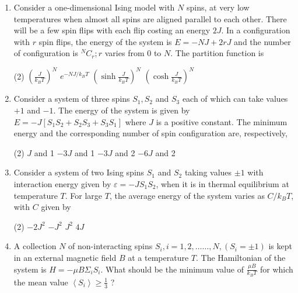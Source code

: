 \begin{enumerate}
\begin{tasks}
		\task[\textbf{b.}]oscillates during evolution to equilibrium
		\task[\textbf{c.}]is a maximum at equilibrium
		\task[\textbf{d.}]is a minimum at equilibrium 
	\end{tasks}
\item 	Consider a one-dimensional Ising model with $N$ spins, at very low temperatures when almost all spins are aligned parallel to each other. There will be a few spin flips with each flip costing an energy $2 J$. In a configuration with $r$ spin flips, the energy of the system is $E=-N J+2 r J$ and the number of configuration is ${ }^{N} C_{r} ; r$ varies from 0 to $N$. The partition function is
{	}
	 \begin{tasks}(2)
		\task[\textbf{a.}] $\left(\frac{J}{k_{B} T}\right)^{N}$
		\task[\textbf{b.}]$e^{-N J / k_{B} T}$
		\task[\textbf{c.}] $\left(\sinh \frac{J}{k_{B} T}\right)^{N}$
		\task[\textbf{d.}] $\left(\cosh \frac{J}{k_{B} T}\right)^{N}$
	\end{tasks}
	\item Consider a system of three spins $S_{1}, S_{2}$ and $S_{3}$ each of which can take values $+1$ and $-1$. The energy of the system is given by $E=-J\left[S_{1} S_{2}+S_{2} S_{3}+S_{3} S_{1}\right]$ where $J$ is a positive constant. The minimum energy and the corresponding number of spin configuration are, respectively,
	{	}
	 \begin{tasks}(2)
		\task[\textbf{a.}]$J$ and 1
		\task[\textbf{b.}]$-3 J$ and 1
		\task[\textbf{c.}]$-3 J$ and 2
		\task[\textbf{d.}]  $-6 J$ and 2
	\end{tasks}
\item 	Consider a system of two Ising spins $S_{1}$ and $S_{2}$ taking values $\pm 1$ with interaction energy given by $\varepsilon=-J S_{1} S_{2}$, when it is in thermal equilibrium at temperature $T$. For large $T$, the average energy of the system varies as $C / k_{B} T$, with $C$ given by
{	}
	 \begin{tasks}(2)
		\task[\textbf{a.}]$-2 J^{2}$
		\task[\textbf{b.}] $-J^{2}$
		\task[\textbf{c.}]$J^{2}$
		\task[\textbf{d.}] $4 J$ 
	\end{tasks}
\item A collection $N$ of non-interacting spins $S_{i}, i=1,2, \ldots \ldots, N,\left(S_{i}=\pm 1\right)$ is kept in an external magnetic field $B$ at a temperature $T$. The Hamiltonian of the system is $H=-\mu B \Sigma_{i} S_{i}$. What should be the minimum value of $\frac{\mu B}{k_{B} T}$ for which the mean value $\left\langle S_{i}\right\rangle \geq \frac{1}{3}$ ?

\end{enumerate}
